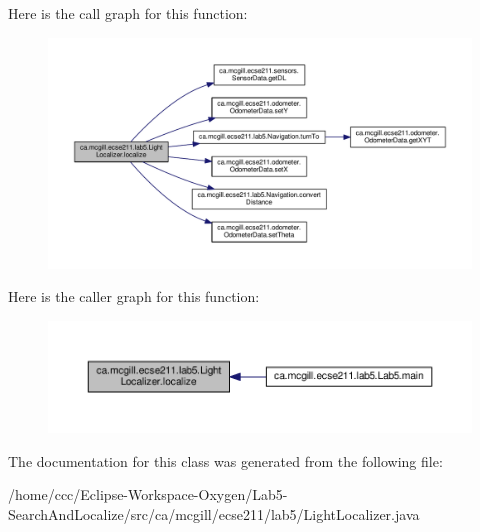 Here is the call graph for this function\+:\nopagebreak
\begin{figure}[H]
\begin{center}
\leavevmode
\includegraphics[width=350pt]{classca_1_1mcgill_1_1ecse211_1_1lab5_1_1_light_localizer_a441f56a899fae5bc9c1d6a6d25fbe0bb_cgraph}
\end{center}
\end{figure}
Here is the caller graph for this function\+:\nopagebreak
\begin{figure}[H]
\begin{center}
\leavevmode
\includegraphics[width=350pt]{classca_1_1mcgill_1_1ecse211_1_1lab5_1_1_light_localizer_a441f56a899fae5bc9c1d6a6d25fbe0bb_icgraph}
\end{center}
\end{figure}


The documentation for this class was generated from the following file\+:\begin{DoxyCompactItemize}
\item 
/home/ccc/\+Eclipse-\/\+Workspace-\/\+Oxygen/\+Lab5-\/\+Search\+And\+Localize/src/ca/mcgill/ecse211/lab5/Light\+Localizer.\+java\end{DoxyCompactItemize}
